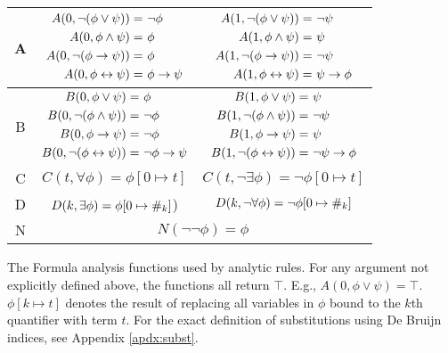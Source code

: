 \begin{centering}
    \begin{tabular}{|c|cc|}
    \hline
    A & 
    {
      $\begin{aligned}
        A(0, \lnot (\phi \lor \psi)) =&\ \lnot \phi\\ 
        A(0, \phi \land \psi) =&\ \phi\\ 
        A(0, \lnot (\phi \to \psi)) =&\ \phi\\ 
        A(0, \phi \leftrightarrow \psi) =&\ \phi \to \psi
      \end{aligned}$
    } &  
    {
      $\begin{aligned}
        A(1, \lnot (\phi \lor \psi)) =&\ \lnot \psi\\
        A(1, \phi \land \psi) =&\  \psi\\
        A(1, \lnot (\phi \to \psi)) =&\  \lnot \psi\\
        A(1, \phi \leftrightarrow \psi) =&\  \psi \to \phi
      \end{aligned}$
    } 
    \\ \hline
    B &
    {
      $\begin{aligned}
        B(0, \phi \lor \psi) =&\  \phi\\ 
        B(0, \lnot (\phi \land \psi)) =&\  \lnot \phi\\ 
        B(0, \phi \to \psi) =&\  \lnot \phi\\ 
        B(0, \lnot (\phi \leftrightarrow \psi)) =&\  \lnot \phi \to \psi
      \end{aligned}$
    } &  
    {
      $\begin{aligned}
        B(1, \phi \lor \psi) =&\  \psi\\
        B(1, \lnot (\phi \land \psi)) =&\  \lnot \psi\\
        B(1, \phi \to \psi) =&\  \psi\\
        B(1, \lnot (\phi \leftrightarrow \psi)) =&\  \lnot \psi \to \phi
      \end{aligned}$
    } 
    \\ \hline
    C & 
    $C(t, \forall \phi) = \phi [0 \mapsto t]$ &
    $C(t, \lnot \exists \phi) = \lnot \phi [0 \mapsto t]$
     \\ \hline
    D & 
    $D(k, \exists \phi) = \phi [0 \mapsto \#_{k}]$) &
    $D(k, \lnot \forall \phi) = \lnot \phi [0 \mapsto \#_{k}]$ 
    \\ \hline
    N & \multicolumn{2}{c|}{$N(\lnot \lnot \phi) = \phi$} 
    \\ \hline
  \end{tabular}
  
\end{centering}

\vspace{5mm}

    The Formula analysis functions used by analytic rules. For any argument not explicitly 
    defined above, the functions all return $\top$. E.g., $A(0, \phi \lor \psi) = \top$.
    $\phi[k \mapsto t]$ denotes the result of replacing all variables in $\phi$ bound 
    to the $k$th quantifier with term $t$. For the exact definition of substitutions 
    using De Bruijn indices, see Appendix \ref{apdx:subst}.
